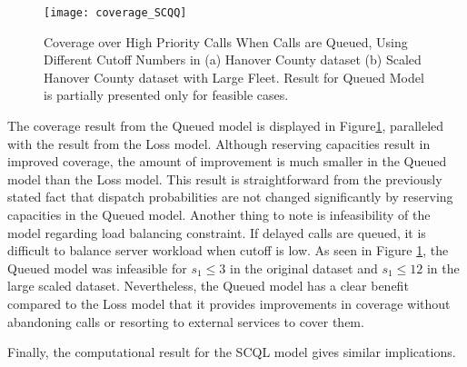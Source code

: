 \documentclass{article}
\begin{document}
\begin{figure}
\centering
\texttt{[image: coverage\_SCQQ]}
\caption{Coverage over High Priority Calls When Calls are Queued, Using Different Cutoff Numbers in (a) Hanover County dataset (b) Scaled Hanover County dataset with Large Fleet. Result for Queued Model is partially presented only for feasible cases.}
\label{fig:coverage_SCQQ}
\end{figure}

The coverage result from the Queued model is displayed in Figure\ref{fig:coverage_SCQQ}, paralleled with the result from the Loss model. Although reserving capacities result in improved coverage, the amount of improvement is much smaller in the Queued model than the Loss model. This result is straightforward from the previously stated fact that dispatch probabilities are not changed significantly by reserving capacities in the Queued model. Another thing to note is infeasibility of the model regarding load balancing constraint. If delayed calls are queued, it is difficult to balance server workload when cutoff is low. As seen in Figure \ref{fig:coverage_SCQQ}, the Queued model was infeasible for $s_1\leq 3$ in the original dataset and $s_1 \leq 12$ in the large scaled dataset. Nevertheless, the Queued model has a clear benefit compared to the Loss model that it provides improvements in coverage without abandoning calls or resorting to external services to cover them.

Finally, the computational result for the SCQL model gives similar implications.

\end{document}
